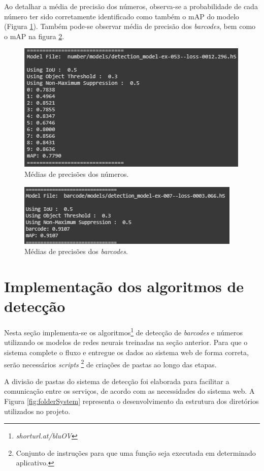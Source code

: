 Ao detalhar a média de precisão dos números, observa-se a probabilidade de cada número ter sido corretamente identificado como também o mAP do modelo (Figura \ref{fig:numberTrained}). Também pode-se observar média de precisão dos \textit{barcodes}, bem como o mAP na figura \ref{fig:barcodeTrained}.


\begin{figure}[H]
	\centering
	\includegraphics[width=0.7\linewidth]{figuras/MachineLearning/numberTrained.png}
	\caption{Médias de precisões dos números.}
	\label{fig:numberTrained}
\end{figure}

\begin{figure}[H]
	\centering
	\includegraphics[width=0.7\linewidth]{figuras/MachineLearning/barcodeTrained.png}
	\caption{Médias de precisões dos \textit{barcodes}.}
	\label{fig:barcodeTrained}
\end{figure}


\section{Implementação dos algoritmos de detecção}

Nesta seção implementa-se os algoritmos\footnote{\textit{shorturl.at/bluOV}} de detecção de \textit{barcodes} e números utilizando os modelos de redes neurais treinadas na seção anterior. Para que o sistema complete o fluxo e entregue os dados ao sistema web de forma correta, serão necessários \textit{scripts} \footnote{Conjunto de instruções para que uma função seja executada em determinado aplicativo.} de criações de pastas ao longo das etapas.

A divisão de pastas do sistema de detecção foi elaborada para facilitar a comunicação entre os serviços, de acordo com as necessidades do sistema web. A Figura \ref{fig:folderSystem} representa o desenvolvimento da estrutura dos diretórios utilizados no projeto.

